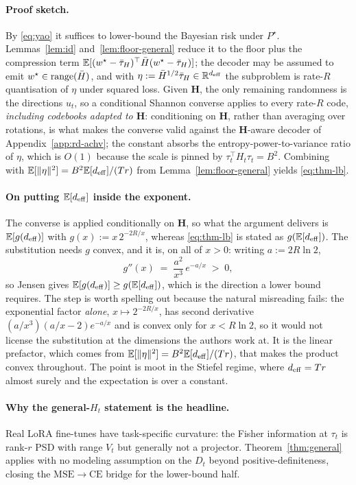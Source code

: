 \paragraph{Proof sketch.} By \eqref{eq:yao} it suffices to lower-bound
the Bayesian risk under $P^\star$. Lemmas~\ref{lem:id}
and~\ref{lem:floor-general} reduce it to the floor plus the
compression term $\mathbb{E}[(w^\star-\bar{\tau}_H)^\top\bar H(w^\star-\bar{\tau}_H)]$; the
decoder may be assumed to emit $w^\star \in \operatorname{range}(\bar H)$, and with
$\eta := \bar H^{1/2}\bar{\tau}_H \in \mathbb{R}^{d_{\mathrm{eff}}}$ the subproblem is rate-$R$
quantisation of $\eta$ under squared loss. Given $\boldsymbol H$, the
only remaining randomness is the directions $u_t$, so a conditional
Shannon converse applies to every rate-$R$ code, \emph{including
codebooks adapted to $\boldsymbol H$}: conditioning on
$\boldsymbol H$, rather than averaging over rotations, is what makes
the converse valid against the $\boldsymbol H$-aware decoder of
Appendix~\ref{app:rd-achv}; the constant absorbs the entropy-power-to-variance
ratio of $\eta$, which is $O(1)$ because the scale is pinned by
$\tau_t^\top H_t \tau_t = B^2$. Combining with
$\mathbb{E}[\|\eta\|^2] = B^2\mathbb{E}[d_{\mathrm{eff}}]/(Tr)$ from
Lemma~\ref{lem:floor-general} yields \eqref{eq:thm-lb}.

\paragraph{On putting $\mathbb{E}[d_{\mathrm{eff}}]$ inside the exponent.} The converse is
applied conditionally on $\boldsymbol H$, so what the argument delivers is
$\mathbb{E}[g(d_{\mathrm{eff}})]$ with $g(x) := x\,2^{-2R/x}$, whereas \eqref{eq:thm-lb} is
stated as $g(\mathbb{E}[d_{\mathrm{eff}}])$. The substitution needs $g$ convex, and it is, on
all of $x > 0$: writing $a := 2R\ln 2$,
\[
  g''(x) \;=\; \frac{a^{2}}{x^{3}}\,e^{-a/x} \;>\; 0 ,
\]
so Jensen gives $\mathbb{E}[g(d_{\mathrm{eff}})] \geq g(\mathbb{E}[d_{\mathrm{eff}}])$, which is the direction a
lower bound requires. The step is worth spelling out because the natural
misreading fails: the exponential factor \emph{alone}, $x \mapsto
2^{-2R/x}$, has second derivative $(a/x^{3})(a/x - 2)e^{-a/x}$ and is
convex only for $x < R\ln 2$, so it would not license the substitution at
the dimensions the authors work at. It is the linear prefactor, which comes from
$\mathbb{E}[\|\eta\|^2] = B^2\mathbb{E}[d_{\mathrm{eff}}]/(Tr)$, that makes the product convex
throughout. The point is moot in the Stiefel regime, where $d_{\mathrm{eff}} = Tr$
almost surely and the expectation is over a constant.

\paragraph{Why the general-$H_t$ statement is the headline.} Real LoRA
fine-tunes have task-specific curvature: the Fisher information at
$\tau_t$ is rank-$r$ PSD with range $V_t$ but generally not a
projector. Theorem~\ref{thm:general} applies with no modeling
assumption on the $D_t$ beyond positive-definiteness, closing the
$\mathrm{MSE}\to\mathrm{CE}$ bridge for the lower-bound half.

